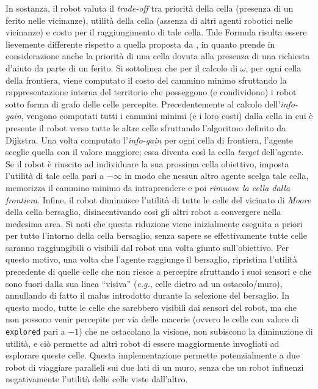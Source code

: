 In sostanza, il robot valuta il \textit{trade-off} tra priorità della cella (presenza di un ferito nelle vicinanze), utilità della cella (assenza di altri agenti robotici nelle vicinanze) e costo per il raggiungimento di tale cella. Tale Formula risulta essere lievemente differente rispetto a quella proposta da \cite{burgard2005}, in quanto prende in considerazione anche la priorità di una cella dovuta alla presenza di una richiesta d'aiuto da parte di un ferito.
Si sottolinea che per il calcolo di $\omega$, per ogni cella della frontiera, viene computato il costo del cammino minimo sfruttando la rappresentazione interna del territorio che posseggono (e condividono) i robot sotto forma di grafo delle celle percepite. Precedentemente al calcolo dell'\textit{info-gain}, vengono computati tutti i cammini minimi (e i loro costi) dalla cella in cui è presente il robot verso tutte le altre celle sfruttando l'algoritmo definito da Dijkstra.
Una volta computato l'\textit{info-gain} per ogni cella di frontiera, l'agente sceglie quella con il valore maggiore; essa diventa così la cella \textit{target} dell'agente.
Se il robot è riuscito ad individuare la sua prossima cella obiettivo, imposta l'utilità di tale cella pari a $-\infty$ in modo che nessun altro agente scelga tale cella, memorizza il cammino minimo da intraprendere e poi \textit{rimuove la cella dalla frontiera}. 
Infine, il robot diminuisce l'utilità di tutte le celle del vicinato di \textit{Moore} della cella bersaglio, disincentivando così gli altri robot a convergere nella medesima area.
Si noti che questa riduzione viene inizialmente eseguita a priori per tutto l'intorno della cella bersaglio, senza sapere se effettivamente tutte celle saranno raggiungibili o visibili dal robot una volta giunto sull'obiettivo. Per questo motivo, una volta che l'agente raggiunge il bersaglio, ripristina l'utilità precedente di quelle celle che non riesce a percepire sfruttando i suoi sensori e che sono fuori dalla sua linea “visiva” (\textit{e.g.}, celle dietro ad un ostacolo/muro), annullando di fatto il malus introdotto durante la selezione del bersaglio. In questo modo, tutte le celle che sarebbero visibili dai sensori del robot, ma che non possono venir percepite per via delle macerie (ovvero le celle con valore di \texttt{explored} pari a $-1$) che ne ostacolano la visione, non subiscono la diminuzione di utilità, e ciò permette ad altri robot di essere maggiormente invogliati ad esplorare queste celle. Questa implementazione permette potenzialmente a due robot di viaggiare paralleli sui due lati di un muro, senza che un robot influenzi negativamente l'utilità delle celle viste dall'altro.

